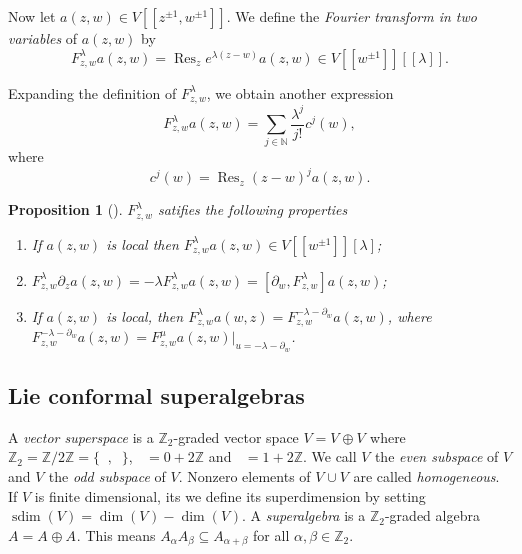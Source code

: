 \documentclass[a4paper, 12pt, reqno]{amsart}
\newtheorem{proposition}[theorem]{Proposition}
\theoremstyle{remark}
\numberwithin{equation}{subsection}
\DeclareMathOperator{\Res}{Res}
\DeclareMathOperator{\zero}{\overline{0}}
\DeclareMathOperator{\one}{\overline{1}}
\DeclareMathOperator{\sdim}{sdim}
\begin{document}
Now let $a(z, w) \in V[[z^{\pm 1}, w^{\pm 1}]]$.
We define the \emph{Fourier transform in two variables} of $a(z, w)$ by
\begin{equation*}
  F^\lambda_{z, w}a(z, w) = \Res_ze^{\lambda(z - w)}a(z, w) \in V[[w^{\pm 1}]][[\lambda]].
\end{equation*}

Expanding the definition of $F^\lambda_{z, w}$, we obtain another expression
\begin{equation*}
  F^\lambda_{z, w}a(z, w) = \sum_{j \in \mathbb{N}}\frac{\lambda^j}{j!}c^j(w),
\end{equation*}
where
\begin{equation*}
  c^j(w) = \Res_z(z - w)^ja(z, w).
\end{equation*}
\begin{proposition}[{\cite[Proposition 1.5.4]{nozaradan_introduction_2008}}]
  \label{prp:2}
  $F^\lambda_{z, w}$ satifies the following properties
  \begin{enumerate}
  \item If $a(z, w)$ is local then $F^\lambda_{z, w}a(z, w) \in V[[w^{\pm 1}]][\lambda]$;
  \item $F^\lambda_{z, w}\partial_za(z, w) = -\lambda F^\lambda_{z, w}a(z, w) = [\partial_w, F^{\lambda}_{z, w}]a(z, w)$;
  \item If $a(z, w)$ is local, then $F^\lambda_{z, w}a(w, z) = F^{-\lambda - \partial_w}_{z, w}a(z, w)$, where $F^{-\lambda - \partial_w}_{z, w}a(z, w) = F^\mu_{z, w}a(z, w)|_{u = -\lambda - \partial_w}$.
  \end{enumerate}
\end{proposition}

\subsection{Lie conformal superalgebras}
\label{sec:lie-conf-super}

A \emph{vector superspace} is a $\mathbb{Z}_2$-graded vector space $V = V_{\zero} \oplus V_{\one}$ where $\mathbb{Z}_2 = \mathbb{Z}/2\mathbb{Z} = \{\zero, \one\}$, $\zero = 0 + 2\mathbb{Z}$ and $\one = 1 + 2\mathbb{Z}$.
We call $V_{\zero}$ the \emph{even subspace} of $V$ and $V_{\one}$ the \emph{odd subspace} of $V$.
Nonzero elements of $V_{\zero}\cup V_{\one}$ are called \emph{homogeneous}.
If $V$ is finite dimensional, its we define its superdimension by setting $\sdim(V) = \dim(V_{\zero}) - \dim(V_{\one})$.
A \emph{superalgebra} is a $\mathbb{Z}_2$-graded algebra $A = A_{\zero} \oplus A_{\one}$.
This means $A_{\alpha}A_{\beta} \subseteq A_{\alpha + \beta}$ for all $\alpha, \beta \in \mathbb{Z}_2$.
\end{document}

